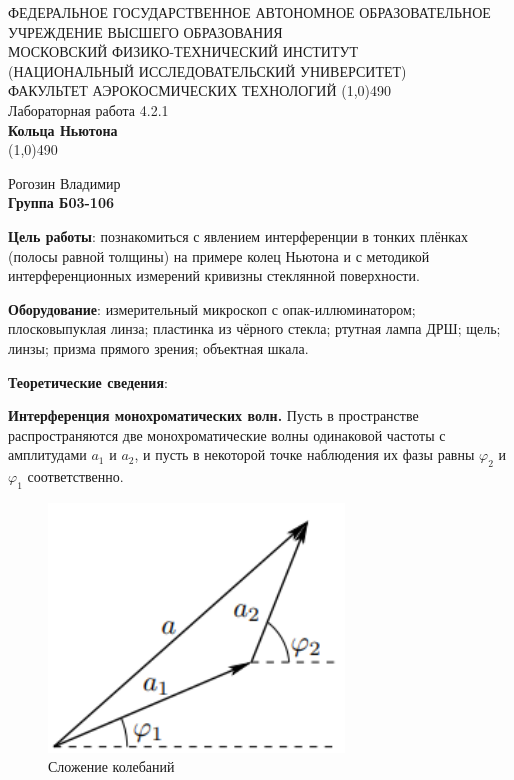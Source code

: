 \documentclass[a4paper,12pt]{article}
\begin{document}
\begin{titlepage}
\begin{center}
\large{\small ФЕДЕРАЛЬНОЕ ГОСУДАРСТВЕННОЕ АВТОНОМНОЕ ОБРАЗОВАТЕЛЬНОЕ\\ УЧРЕЖДЕНИЕ ВЫСШЕГО ОБРАЗОВАНИЯ \\ МОСКОВСКИЙ ФИЗИКО-ТЕХНИЧЕСКИЙ ИНСТИТУТ\\ (НАЦИОНАЛЬНЫЙ ИССЛЕДОВАТЕЛЬСКИЙ УНИВЕРСИТЕТ)\\ ФАКУЛЬТЕТ АЭРОКОСМИЧЕСКИХ ТЕХНОЛОГИЙ}
\vfill
\line(1,0){490}\\[1mm]
\huge{Лабораторная работа 4.2.1}\\
\huge\textbf{Кольца Ньютона}\\
\line(1,0){490}\\[1mm]
\vfill
\begin{flushright}
\normalsize{Рогозин Владимир}\\
\normalsize{\textbf{Группа Б03-106}}\\
\end{flushright}
\end{center}
\end{titlepage}


\textbf{Цель работы}: 
познакомиться с явлением интерференции в тонких плёнках (полосы равной толщины) на примере колец Ньютона и с методикой интерференционных измерений кривизны стеклянной поверхности.


\textbf{Оборудование}:
измерительный микроскоп с опак-иллюминатором; плосковыпуклая линза; пластинка из чёрного стекла; ртутная лампа ДРШ; щель; линзы; призма прямого зрения; объектная шкала.


\textbf{Теоретические сведения}:

\textbf{Интерференция монохроматических волн.}
Пусть в пространстве распространяются две монохроматические
волны одинаковой частоты с амплитудами $a_1$ и $a_2$, и пусть в некоторой
точке наблюдения их фазы равны $\varphi_2$ и $\varphi_1$ соответственно.

\begin{figure}\label{fig: Сложение колебаний}
    \begin{center}
    \vspace{-20pt}
        \includegraphics[width = 0.7\textwidth]{Сложение колебаний.png}
    \end{center}
    \caption{Сложение колебаний}
\end{figure}
\end{document}
